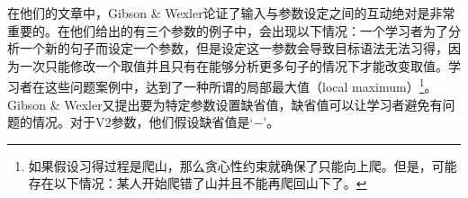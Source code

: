 在他们的文章中，Gibson \& Wexler论证了输入与参数设定之间的互动绝对是非常重要的。在他们给出的有三个参数的例子中，会出现以下情况：一个学习者为了分析一个新的句子而设定一个参数，但是设定这一参数会导致目标语法无法习得，因为一次只能修改一个取值并且只有在能够分析更多句子的情况下才能改变取值。学习者在这些问题案例中，达到了一种所谓的局部最大值（local maximum）\footnote{%
如果假设习得过程是爬山，那么贪心性约束就确保了只能向上爬。但是，可能存在以下情况：某人开始爬错了山并且不能再爬回山下了。 
}。Gibson \& Wexler又提出要为特定参数设置缺省值，缺省值可以让学习者避免有问题的情况。对于V2参数，他们假设缺省值是`$-$'。


